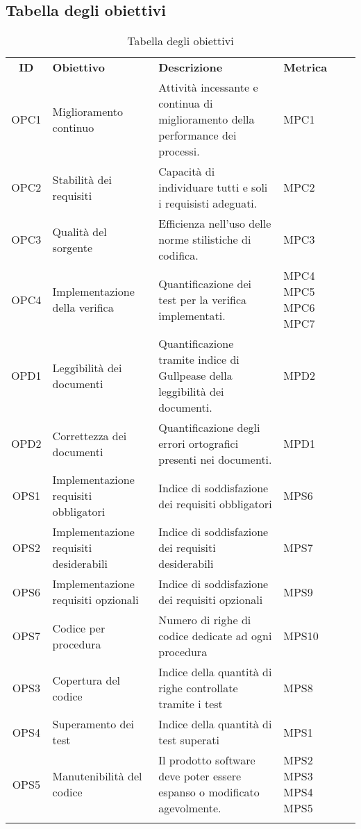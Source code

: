 \subsection{Tabella degli obiettivi}

\begin{longtable}{| c | p{3cm} | p{5cm} | p{2cm} | p{3cm} |}
	\rowcolor{LightBlue}
	\color{white}\bfseries ID & \color{white}\bfseries Obiettivo & \color{white}\bfseries Descrizione & \color{white}\bfseries Metrica \\[0.25cm]
	OPC1 & Miglioramento continuo & Attività incessante e continua di miglioramento della performance dei processi. & MPC1\\ \hline
	OPC2 & Stabilità dei requisiti & Capacità di individuare tutti e soli i requisisti adeguati. & MPC2  \\ \hline
	OPC3 & Qualità del sorgente & Efficienza nell'uso delle norme stilistiche di codifica. & MPC3 \\ \hline
	OPC4 & Implementazione della verifica & Quantificazione dei test per la verifica implementati. & MPC4 \newline MPC5 \newline MPC6 \newline MPC7 \\ \hline
	OPD1 & Leggibilità dei documenti & Quantificazione tramite indice di Gullpease della leggibilità dei documenti. & MPD2 \\ \hline
	OPD2 & Correttezza dei documenti & Quantificazione degli errori ortografici presenti nei documenti. & MPD1  \\ \hline
	OPS1 & Implementazione requisiti obbligatori & Indice di soddisfazione dei requisiti obbligatori & MPS6 \\ \hline
	OPS2 & Implementazione requisiti desiderabili & Indice di soddisfazione dei requisiti desiderabili & MPS7 \\ \hline
	OPS6 & Implementazione requisiti opzionali & Indice di soddisfazione dei requisiti opzionali & MPS9 \\ \hline
	OPS7 & Codice per procedura & Numero di righe di codice dedicate ad ogni procedura & MPS10 \\ \hline
	OPS3 & Copertura del codice & Indice della quantità di righe controllate tramite i test & MPS8 \\ \hline
	OPS4 & Superamento dei test & Indice della quantità di test superati & MPS1 \\ \hline
	OPS5 & Manutenibilità del codice & Il prodotto software deve poter essere espanso o modificato agevolmente. & MPS2 \newline MPS3 \newline MPS4 \newline MPS5\\ \hline 
	\caption{Tabella degli obiettivi} 
\end{longtable}